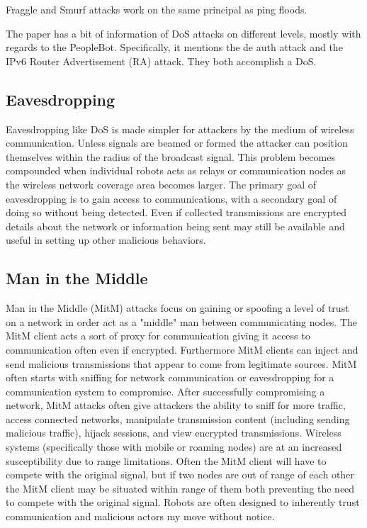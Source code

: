 Fraggle and Smurf attacks work on the same principal as ping floods.  

The paper \cite{Yousef2017PeopleBot} has a bit of information of DoS attacks on different levels, mostly with regards to the PeopleBot. Specifically, it mentions the de auth attack and the IPv6 Router Advertisement (RA) attack. They both accomplish a DoS.

\subsection{Eavesdropping}
Eavesdropping like DoS is made simpler for attackers by the medium of wireless communication.  Unless signals are beamed or formed the attacker can position themselves within the radius of the broadcast signal. This problem becomes compounded when individual robots acts as relays or communication nodes as the wireless network coverage area becomes larger.  The primary goal of eavesdropping is to gain access to communications, with a secondary goal of doing so without being detected.  Even if collected transmissions are encrypted details about the network or information being sent may still be available and useful in setting up other malicious behaviors.  

\subsection{Man in the Middle}
Man in the Middle (MitM) attacks focus on gaining or spoofing a level of trust on a network in order act as a "middle" man between communicating nodes. The MitM client acts a sort of proxy for communication giving it access to communication often even if encrypted.  Furthermore MitM clients can inject and send malicious transmissions that appear to come from legitimate sources.  MitM often starts with sniffing for network communication or eavesdropping for a communication system to compromise.  After successfully compromising a network, MitM attacks often give attackers the ability to sniff for more traffic, access connected networks, manipulate transmission content (including sending malicious traffic), hijack sessions, and view encrypted transmissions.  Wireless systems (specifically those with mobile or roaming nodes) are at an increased susceptibility due to range limitations.  Often the MitM client will have to compete with the original signal, but if two nodes are out of range of each other the MitM client may be situated within range of them both preventing the need to compete with the original signal. Robots are often designed to inherently trust communication and malicious actors my move without notice. 

